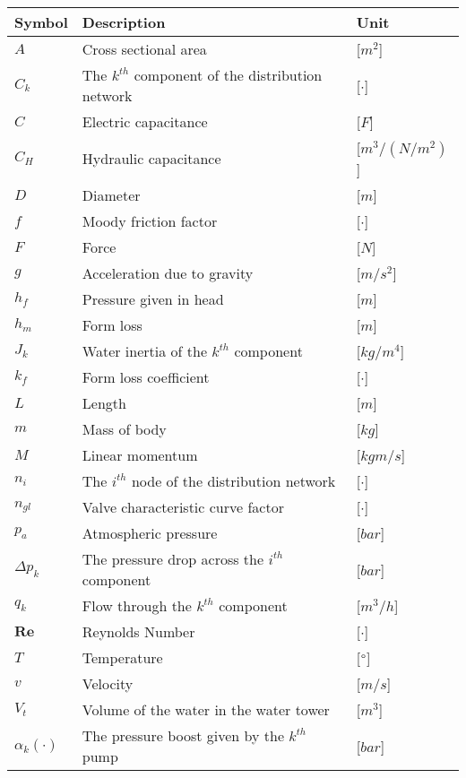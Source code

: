 \begin{tabular}{l l l} 
	\textbf{Symbol}	&	\textbf{Description}										& \textbf{Unit}	\\\hline
	$A$				&	Cross sectional area									    & [$m^2$]\\
	$C_k$			&	The $k^{th}$ component of the distribution network     		& [$\cdot$]\\
	$C$				&	Electric capacitance								   		& [$F$]\\
	$C_H$			&	Hydraulic capacitance								   		& [$m^3/(N/m^2)$]\\
	$D$				&	Diameter									     			& [$m$]\\
	$f$				&	Moody friction factor									    & [$\cdot$]\\
	$F$				&	Force									     				& [$N$]\\
	$g$				&	Acceleration due to gravity									& [$m/s^2$]\\
	$h_f$			&	Pressure given in head									    & [$m$]\\
	$h_m$			&	Form loss									    			& [$m$]\\
	$J_k$			&	Water inertia of the $k^{th}$ component						& [$kg/m^4$]\\
	$k_f$			&	Form loss coefficient								    	& [$\cdot$]\\
	$L$				&	Length									     				& [$m$]\\
	$m$				&	Mass of body									     		& [$kg$]\\
	$M$				&	Linear momentum									     		& [$kgm/s$]\\
	$n_i$			&	The $i^{th}$ node of the distribution network     			& [$\cdot$]\\
	$n_{gl}$		&	Valve characteristic curve factor							& [$\cdot$]\\
	$p_a$			&	Atmospheric pressure							      		& [$bar$]\\
	$\Delta p_k$	&	The pressure drop across the $i^{th}$ component      		& [$bar$]\\
	$q_k$			&	Flow through the $k^{th}$ component 		     			& [$m^3/h$]\\
	$\pmb{Re}$		&	Reynolds Number								     			& [$\cdot$]\\
	$T$				&	Temperature									     			& [$\degree$]\\
	$v$				&	Velocity									     			& [$m/s$]\\
	$V_t$			&	Volume of the water in the water tower						& [$m^3$]\\
	$\alpha_k(\cdot)$	&	The pressure boost given by the	$k^{th}$ pump				& [$bar$]\\

\end{tabular}
